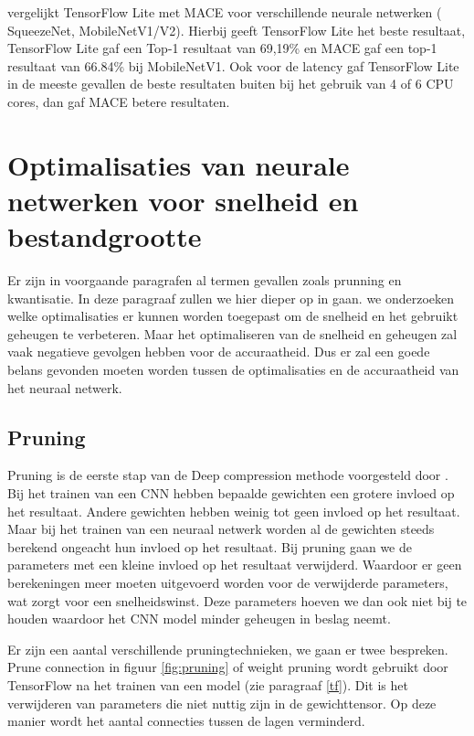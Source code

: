 \cite{febvay_low-level_2020} vergelijkt TensorFlow Lite met MACE voor verschillende neurale netwerken ( SqueezeNet, MobileNetV1/V2).
Hierbij geeft TensorFlow Lite het beste resultaat, TensorFlow Lite gaf een Top-1 resultaat van 69,19\% en MACE gaf een top-1 resultaat van 66.84\% bij MobileNetV1.
Ook voor de latency gaf TensorFlow Lite in de meeste gevallen de beste resultaten buiten bij het gebruik van 4 of 6 CPU cores, dan gaf MACE betere resultaten.  

\section{Optimalisaties van neurale netwerken voor snelheid en bestandgrootte} \label{optim}
Er zijn in voorgaande paragrafen al termen gevallen zoals prunning en kwantisatie.
In deze paragraaf zullen we hier dieper op in gaan.
we onderzoeken welke optimalisaties er kunnen worden toegepast om de snelheid en het gebruikt geheugen te verbeteren.
Maar het optimaliseren van de snelheid en geheugen zal vaak negatieve gevolgen hebben voor de accuraatheid.
Dus er zal een goede belans gevonden moeten worden tussen de optimalisaties en de accuraatheid van het neuraal netwerk.

\subsection{Pruning}
Pruning is de eerste stap van de Deep compression methode voorgesteld door \cite{han_deep_2016}.
Bij het trainen van een CNN hebben bepaalde gewichten een grotere invloed op het resultaat.
Andere gewichten hebben weinig tot geen invloed op het resultaat.
Maar bij het trainen van een neuraal netwerk worden al de gewichten steeds berekend ongeacht hun invloed op het resultaat.
Bij pruning gaan we de parameters met een kleine invloed op het resultaat verwijderd.
Waardoor er geen berekeningen meer moeten uitgevoerd worden voor de verwijderde parameters, wat zorgt voor een snelheidswinst.
Deze parameters hoeven we dan ook niet bij te houden waardoor het CNN model minder geheugen in beslag neemt.

Er zijn een aantal verschillende pruningtechnieken, we gaan er twee bespreken.
Prune connection in figuur \ref{fig:pruning} of weight pruning wordt gebruikt door TensorFlow na het trainen van een model (zie paragraaf \ref{tf}).
Dit is het verwijderen van parameters die niet nuttig zijn in de gewichttensor.
Op deze manier wordt het aantal connecties tussen de lagen verminderd.

